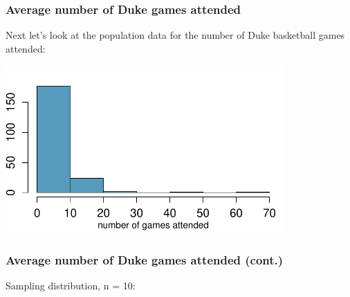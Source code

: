 \documentclass[11pt,containsverbatim,handout,xcolor=xelatex,dvipsnames,table]{beamer}
\newcommand{\soln}[1]{}
\begin{document}

\begin{frame}[fragile]
\frametitle{Average number of Duke games attended}

Next let's look at the population data for the number of Duke basketball games attended:

\begin{center}
\includegraphics[width=0.8\textwidth]{figures/duke_games/hist_duke_games_pop}
\end{center}


\end{frame}


\begin{frame}[fragile]
\frametitle{Average number of Duke games attended (cont.)}

Sampling distribution, n = 10:

{
\soln{\only<2->{Sample mean, $\bar{x}$, of samples of size $n = 10$.}}
\soln{\only<3->{Smaller, sample means will vary less than individual observations.}}
}

\end{frame}
\end{document}
